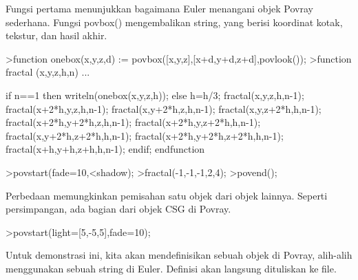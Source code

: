 \documentclass[12pt,arial,letterpaper]{book}
\begin{document}
\begin{eulercomment}
\begin{eulercomment}
\begin{eulercomment}
\begin{eulercomment}
\begin{eulercomment}
\begin{eulercomment}
\begin{eulercomment}
\begin{eulercomment}
\begin{eulercomment}
\begin{eulercomment}
\begin{eulercomment}
\begin{eulercomment}
\begin{eulercomment}
\begin{eulercomment}
\begin{eulercomment}
\begin{eulercomment}
\begin{eulercomment}
\begin{eulercomment}
\begin{eulercomment}
Fungsi pertama menunjukkan bagaimana Euler menangani objek Povray
sederhana. Fungsi povbox() mengembalikan string, yang berisi koordinat
kotak, tekstur, dan hasil akhir.
\end{eulercomment}
\begin{eulerprompt}
>function onebox(x,y,z,d) := povbox([x,y,z],[x+d,y+d,z+d],povlook());
>function fractal (x,y,z,h,n) ...
\end{eulerprompt}
\begin{eulerudf}
   if n==1 then writeln(onebox(x,y,z,h));
   else
     h=h/3;
     fractal(x,y,z,h,n-1);
     fractal(x+2*h,y,z,h,n-1);
     fractal(x,y+2*h,z,h,n-1);
     fractal(x,y,z+2*h,h,n-1);
     fractal(x+2*h,y+2*h,z,h,n-1);
     fractal(x+2*h,y,z+2*h,h,n-1);
     fractal(x,y+2*h,z+2*h,h,n-1);
     fractal(x+2*h,y+2*h,z+2*h,h,n-1);
     fractal(x+h,y+h,z+h,h,n-1);
   endif;
  endfunction
\end{eulerudf}
\begin{eulerprompt}
>povstart(fade=10,<shadow);
>fractal(-1,-1,-1,2,4);
>povend();
\end{eulerprompt}
\begin{eulercomment}
Perbedaan memungkinkan pemisahan satu objek dari objek lainnya.
Seperti persimpangan, ada bagian dari objek CSG di Povray.
\end{eulercomment}
\begin{eulerprompt}
>povstart(light=[5,-5,5],fade=10);
\end{eulerprompt}
\begin{eulercomment}
Untuk demonstrasi ini, kita akan mendefinisikan sebuah objek di
Povray, alih-alih menggunakan sebuah string di Euler. Definisi akan
langsung dituliskan ke file.


\end{eulercomment}
\end{eulercomment}
\end{eulercomment}
\end{eulercomment}
\end{eulercomment}
\end{eulercomment}
\end{eulercomment}
\end{eulercomment}
\end{eulercomment}
\end{eulercomment}
\end{eulercomment}
\end{eulercomment}
\end{eulercomment}
\end{eulercomment}
\end{eulercomment}
\end{eulercomment}
\end{eulercomment}
\end{eulercomment}
\end{eulercomment}
\end{document}
